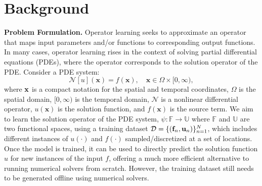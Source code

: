 \section{Background}
\noindent\textbf{Problem Formulation.} Operator learning seeks to approximate an operator that maps input parameters and/or functions to corresponding output functions.  
In many cases, operator learning rises in the context of solving partial differential equations (PDEs), where the operator corresponds to the solution operator of the PDE.
Consider a PDE system:
\begin{equation}
	\label{eq:pde}
	\mathcal{N}[u](\mathbf{x}) = f(\mathbf{x}), \quad \mathbf{x} \in \Omega \times [0,\infty), 
\end{equation}
where ${\bf x}$ is a compact notation for the spatial and temporal coordinates, $\Omega$ is the spatial domain, $[0,\infty)$ is the temporal domain, $\mathcal{N}$ is a nonlinear differential operator, $u(\mathbf{x})$ is the solution function, and $f(\mathbf{x})$ is the source term. %
We aim to learn the solution operator of the PDE system, \({\psi}: \mathbb{F} \rightarrow \mathbb{U}\) where $\mathbb{F}$ and $\mathbb{U}$ are two functional spaces,  using a training dataset \(\mathcal{D} = \{({\bf f}_n,{\bf u}_n)\}_{n=1}^N\), which includes different instances of  $u(\cdot)$ and $f(\cdot)$ sampled/discretized at a set of locations. Once the model is trained, it can be used to directly predict the solution function $u$ for new instances of the input $f$,   offering a much more efficient alternative to running numerical solvers from scratch. However, the training dataset still needs to be generated offline using numerical solvers.




